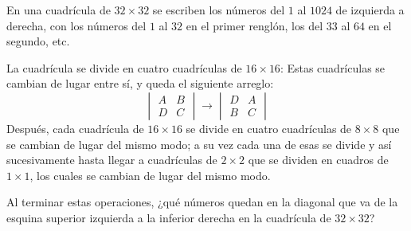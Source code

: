 En una cuadrícula de $32\times 32$ se escriben los números del $1$ al $1024$ de izquierda a derecha, con los números del $1$ al $32$ en el primer renglón, los del $33$ al $64$ en el segundo, etc. 

La cuadrícula se divide en cuatro cuadrículas de $16\times 16$:
 \newline 
Estas cuadrículas se cambian de lugar entre sí, y queda el siguiente arreglo:
\[\begin{vmatrix}A&B\\D&C\end{vmatrix}\to\begin{vmatrix}D&A\\B&C\end{vmatrix}\]
Después, cada cuadrícula de $16\times 16$ se divide en cuatro cuadrículas de $8\times 8$ que se cambian de lugar del mismo modo; a su vez cada una de esas se divide y así sucesivamente hasta llegar a cuadrículas de $2\times 2$ que se dividen en cuadros de $1\times 1$, los cuales se cambian de lugar del mismo modo.

Al terminar estas operaciones, ¿qué números quedan en la diagonal que va de la esquina superior izquierda a la inferior derecha en la cuadrícula de $32\times 32$?